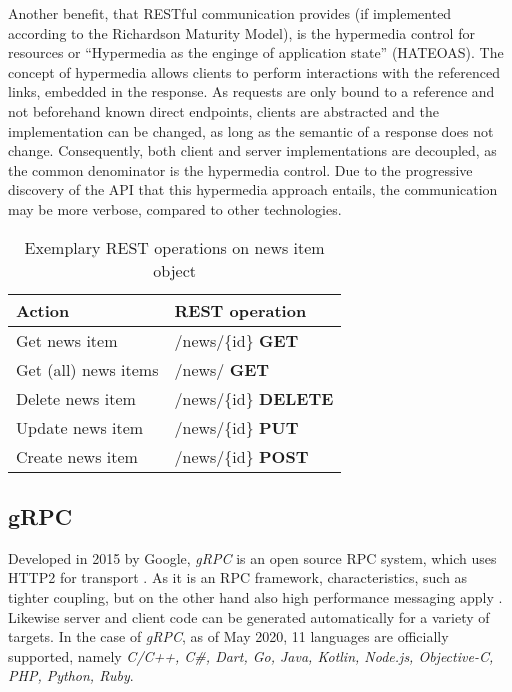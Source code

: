 Another benefit, that RESTful communication provides (if implemented according to the Richardson Maturity Model), is the hypermedia control for resources or \enquote{Hypermedia as the enginge of application state} (HATEOAS).
The concept of hypermedia allows clients to perform interactions with the referenced links, embedded in the response.
As requests are only bound to a reference and not beforehand known direct endpoints, clients are abstracted and the implementation can be changed, as long as the semantic of a response does not change.
Consequently, both client and server implementations are decoupled, as the common denominator is the hypermedia control.
Due to the progressive discovery of the \ac{API} that this hypermedia approach entails, the communication may be more verbose, compared to other technologies.

\begin{table}
	\centering
	\begin{tabular}{ |l|l| }
		\hline
		Action               & REST operation               \\
		\hline
		Get news item        & /news/\{id\} \textbf{GET}    \\
		Get (all) news items & /news/ \textbf{GET}          \\
		Delete news item     & /news/\{id\} \textbf{DELETE} \\
		Update news item     & /news/\{id\} \textbf{PUT}    \\
		Create news item     & /news/\{id\} \textbf{POST}   \\
		\hline
	\end{tabular}
	\caption{Exemplary \ac{REST} operations on news item object} \label{tab:restExample}
\end{table}

\subsection{ gRPC}\label{cha:Technologies:communication:grpc}

Developed in 2015 by Google, \textit{gRPC} is an open source \ac{RPC} system, which uses HTTP2 for transport \cite{gRPCAuthors.25.05.2020}.
As it is an \ac{RPC} framework, characteristics, such as tighter coupling, but on the other hand also high performance messaging apply \cite[p.~93f.]{Newman.2015}.
Likewise server and client code can be generated automatically for a variety of targets.
In the case of \textit{gRPC}, as of May 2020, 11 languages are officially supported, namely \textit{C/C++, C\#, Dart, Go, Java, Kotlin, Node.js, Objective-C, PHP, Python, Ruby}.

